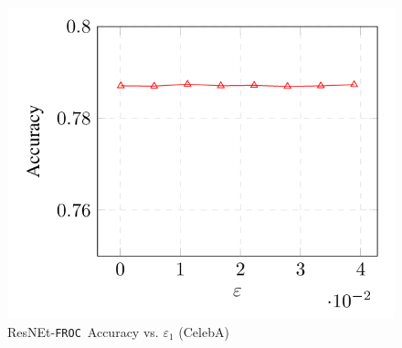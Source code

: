 \documentclass{article}
\newcommand{\ouralgo}{\texttt{FROC}}
\begin{document}
\begin{figure}[!h]
    \centering
    \includegraphics[width=1\linewidth]{Images/CelebA_Accuracy.png}
    \caption{ResNEt-\ouralgo\  Accuracy vs. $\varepsilon_1$ (CelebA)}
    \label{fig:CelebA_Accuracy}
\end{figure}






        
\end{document}
